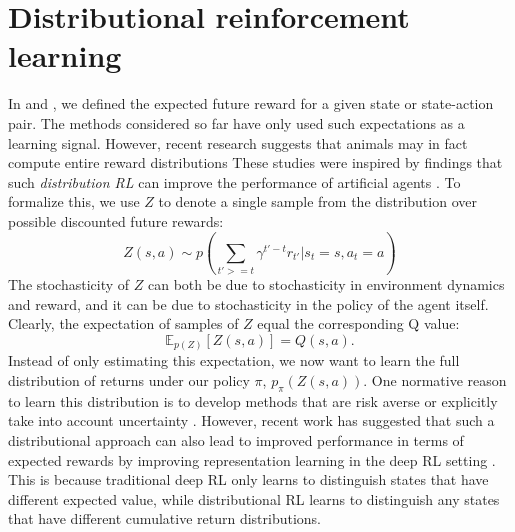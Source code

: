 \section{Distributional reinforcement learning}
\label{sec:distributional}

In  and , we defined the expected future reward for a given state or state-action pair.
The methods considered so far have only used such expectations as a learning signal.
However, recent research suggests that animals may in fact compute entire reward distributions \citep{dabney2020distributional, sousa2023dopamine}
These studies were inspired by findings that such \emph{distribution RL} can improve the performance of artificial agents \citep{bellemare2017distributional, bellemare2023distributional,dabney2018distributional}.
To formalize this, we use $Z$ to denote a single sample from the distribution over possible discounted future rewards:
\begin{equation}
    Z(s, a) \sim p \left ( \sum_{t' >= t} \gamma^{t' - t} r_{t'} | s_t = s, a_t = a \right )
\end{equation}
The stochasticity of $Z$ can both be due to stochasticity in environment dynamics and reward, and it can be due to stochasticity in the policy of the agent itself.
Clearly, the expectation of samples of $Z$ equal the corresponding Q value:
\begin{equation}
    \mathbb{E}_{p(Z)} \left [ Z(s, a) \right ] = Q(s, a).
\end{equation}
Instead of only estimating this expectation, we now want to learn the full distribution of returns under our policy $\pi$, $p_\pi(Z(s, a))$.
One normative reason to learn this distribution is to develop methods that are risk averse \citep{morimura2010nonparametric,morimura2012parametric} or explicitly take into account uncertainty \citep{dearden1998bayesian}.
However, recent work has suggested that such a distributional approach can also lead to improved performance in terms of expected rewards by improving representation learning in the deep RL setting \citep{bellemare2017distributional,dabney2018distributional,rowland2019statistics,bellemare2023distributional}.
This is because traditional deep RL only learns to distinguish states that have different expected value, while distributional RL learns to distinguish any states that have different cumulative return distributions.

